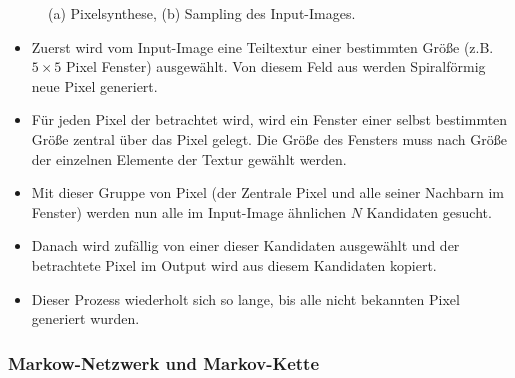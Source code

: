 \documentclass[12pt, a4paper,twoside,openright]{report}
\begin{document}
\begin{figure}[H]
    \centering
    \qquad
    \caption{(a) Pixelsynthese, (b) Sampling des Input-Images.}%
\end{figure}


\begin{itemize}
    \item Zuerst wird vom Input-Image eine Teiltextur einer bestimmten Größe {(z.B. $5\times 5$ Pixel Fenster)} ausgewählt. Von diesem Feld aus werden Spiralförmig neue Pixel generiert.
    \item Für jeden Pixel der betrachtet wird, wird ein Fenster einer selbst bestimmten Größe zentral über das Pixel gelegt.
    Die Größe des Fensters muss nach Größe der einzelnen Elemente der Textur gewählt werden.
    \item Mit dieser Gruppe von Pixel {(der Zentrale Pixel und alle seiner Nachbarn im Fenster)} werden nun alle im Input-Image ähnlichen $N$ Kandidaten gesucht.
    \item Danach wird zufällig von einer dieser Kandidaten ausgewählt und der betrachtete Pixel im Output wird aus diesem Kandidaten kopiert.
    \item Dieser Prozess wiederholt sich so lange, bis alle nicht bekannten Pixel generiert wurden. \cite[S.4]{GomathiShah2009}
\end{itemize}

\subsubsection{Markow-Netzwerk und Markov-Kette}
\end{document}
